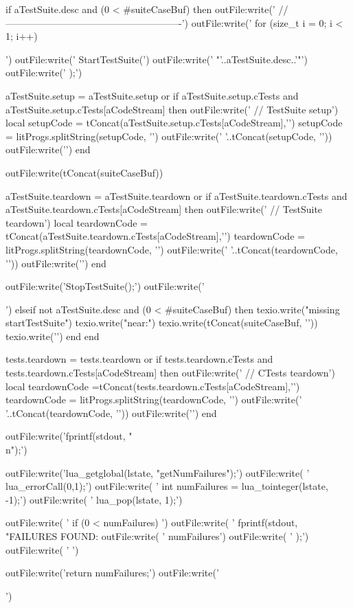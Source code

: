 {    if aTestSuite.desc and (0 < #suiteCaseBuf) then
      outFile:write('  //-------------------------------------------------------\n')
      outFile:write('  for (size_t i = 0; i < 1; i++) {\n\n')
      outFile:write('    StartTestSuite(\n')
      outFile:write('      "'..aTestSuite.desc..'"\n')
      outFile:write('    );\n\n')

      aTestSuite.setup = aTestSuite.setup or { }
      if aTestSuite.setup.cTests and
        aTestSuite.setup.cTests[aCodeStream] then
        outFile:write('    // TestSuite setup\n')
        local setupCode = tConcat(aTestSuite.setup.cTests[aCodeStream],'\n  ')
        setupCode = litProgs.splitString(setupCode, '\n')
        outFile:write('    '..tConcat(setupCode, '\n    '))
        outFile:write('\n\n')
      end

      outFile:write(tConcat(suiteCaseBuf))

      aTestSuite.teardown = aTestSuite.teardown or { }
      if aTestSuite.teardown.cTests and
        aTestSuite.teardown.cTests[aCodeStream] then
        outFile:write('    // TestSuite teardown\n')
        local teardownCode = tConcat(aTestSuite.teardown.cTests[aCodeStream],'\n  ')
        teardownCode = litProgs.splitString(teardownCode, '\n')
        outFile:write('    '..tConcat(teardownCode, '\n    '))
        outFile:write('\n\n')
      end

      outFile:write('\n    StopTestSuite();\n\n')
      outFile:write('  }\n\n')
    elseif not aTestSuite.desc and (0 < #suiteCaseBuf) then
      texio.write("\nERROR missing \\startTestSuite\n")
      texio.write("near:\n")
      texio.write(tConcat(suiteCaseBuf, '\n'))
      texio.write('\n')
    end
  end

  tests.teardown = tests.teardown or { }
  if tests.teardown.cTests and
    tests.teardown.cTests[aCodeStream] then
    outFile:write('  // CTests teardown\n')
    local teardownCode =tConcat(tests.teardown.cTests[aCodeStream],'\n  ')
    teardownCode = litProgs.splitString(teardownCode, '\n')
    outFile:write('  '..tConcat(teardownCode, '\n  '))
    outFile:write('\n\n')
  end

  outFile:write('\n  fprintf(stdout, "\\n");\n\n')

  outFile:write('\n  lua_getglobal(lstate, "getNumFailures");\n')
  outFile:write(  '  lua_errorCall(0,1);\n')
  outFile:write(  '  int numFailures = lua_tointeger(lstate, -1);\n')
  outFile:write(  '  lua_pop(lstate, 1);\n\n')

  outFile:write(  '  if (0 < numFailures) {\n')
  outFile:write(  '    fprintf(stdout, "FAILURES FOUND: %
  outFile:write(  '      numFailures\n')
  outFile:write(  '    );\n')
  outFile:write(  '  }\n')

  outFile:write('\n  return numFailures;\n')
  outFile:write('}\n')

